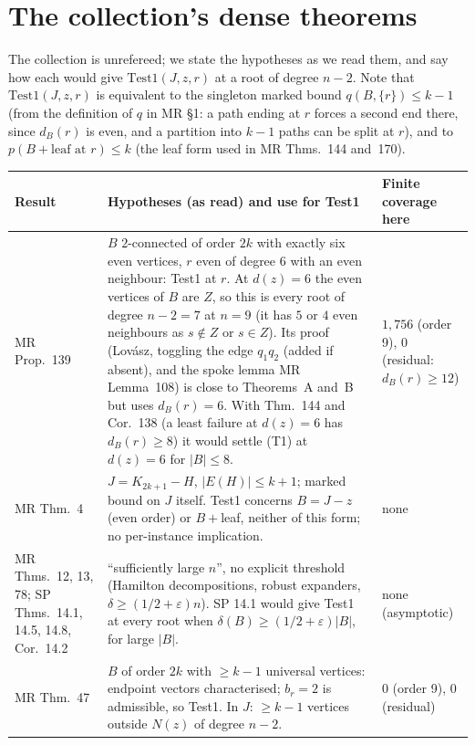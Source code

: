 \documentclass[11pt]{amsart}
\theoremstyle{definition}
\begin{document}
\section{The collection's dense theorems}\label{sec:mr}

The collection is unrefereed; we state the hypotheses as we read them, and say how each would give
$\mathrm{Test1}(J,z,r)$ at a root of degree $n-2$. Note that $\mathrm{Test1}(J,z,r)$ is equivalent to the
singleton marked bound $q(B,\{r\})\le k-1$ (from the definition of $q$ in MR \S1: a path ending
at $r$ forces a second end there, since $d_B(r)$ is even, and a partition into $k-1$ paths can be split
at $r$), and to $p(B+\text{leaf at }r)\le k$ (the leaf form used in MR Thms.~144 and~170).
\begin{center}\small
\begin{tabular}{@{}>{\raggedright\arraybackslash}p{}>{\raggedright\arraybackslash}p{}>{\raggedright\arraybackslash}p{}@{}}
\toprule
Result & Hypotheses (as read) and use for Test1 & Finite coverage here\\
\midrule
MR Prop.~139 & $B$ $2$-connected of order $2k$ with exactly six even vertices, $r$ even of degree $6$
with an even neighbour: Test1 at $r$. At $d(z)=6$ the even vertices of $B$ are $Z$, so this is every
root of degree $n-2=7$ at $n=9$ (it has $5$ or $4$ even neighbours as $s\notin Z$ or $s\in Z$). Its
proof (Lov\'asz, toggling the edge $q_1q_2$ (added if absent), and the spoke lemma MR Lemma~108) is close
to Theorems~A and~B but uses $d_B(r)=6$. With Thm.~144 and Cor.~138 (a least failure at $d(z)=6$ has
$d_B(r)\ge8$) it would settle (T1) at $d(z)=6$ for $|B|\le8$. & $1{,}756$ (order 9), $0$ (residual:
$d_B(r)\ge12$)\\
MR Thm.~4 & $J=K_{2k+1}-H$, $|E(H)|\le k+1$; marked bound on $J$ itself. Test1 concerns $B=J-z$ (even
order) or $B+$leaf, neither of this form; no per-instance implication. & none\\
MR Thms.~12, 13, 78; SP Thms.~14.1, 14.5, 14.8, Cor.~14.2 & ``sufficiently large $n$'', no explicit
threshold (Hamilton decompositions, robust expanders, $\delta\ge(1/2+\varepsilon)n$). SP 14.1 would give
Test1 at every root when $\delta(B)\ge(1/2+\varepsilon)|B|$, for large $|B|$. & none (asymptotic)\\
MR Thm.~47 & $B$ of order $2k$ with $\ge k-1$ universal vertices: endpoint vectors characterised;
$b_r=2$ is admissible, so Test1. In $J$: $\ge k-1$ vertices outside $N(z)$ of degree $n-2$. & $0$ (order
9), $0$ (residual)\\

\end{tabular}
\end{center}
\end{document}
